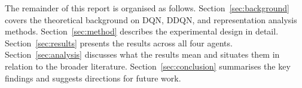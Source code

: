 The remainder of this report is organised as follows. Section~\ref{sec:background} covers the theoretical background on DQN, DDQN, and representation analysis methods. Section~\ref{sec:method} describes the experimental design in detail. Section~\ref{sec:results} presents the results across all four agents. Section~\ref{sec:analysis} discusses what the results mean and situates them in relation to the broader literature. Section~\ref{sec:conclusion} summarises the key findings and suggests directions for future work.

